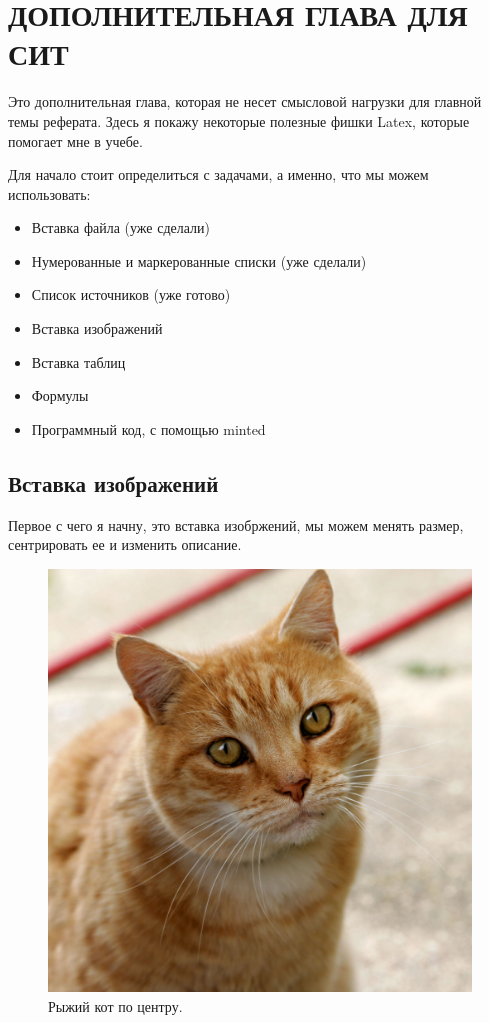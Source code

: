\section{\textbf{ДОПОЛНИТЕЛЬНАЯ ГЛАВА ДЛЯ СИТ}}

Это дополнительная глава, которая не несет смысловой нагрузки для главной темы реферата. Здесь я покажу некоторые полезные фишки Latex, которые помогает мне в учебе.

Для начало стоит определиться с задачами, а именно, что мы можем использовать:
\begin{itemize}
    \item Вставка файла (уже сделали)
    \item Нумерованные и маркерованные списки (уже сделали)
    \item Список источников (уже готово)
    \item Вставка изображений
    \item Вставка таблиц
    \item Формулы
    \item Программный код, с помощью minted
\end{itemize}

\subsection{Вставка изображений}
Первое с чего я начну, это вставка изобржений, мы можем менять размер, сентрировать ее и изменить описание.

\begin{figure}[H]
\centering
\includegraphics[width=0.5\linewidth]{cat.jpeg}
\caption{\label{fig:cat}Рыжий кот по центру.}
\end{figure}

